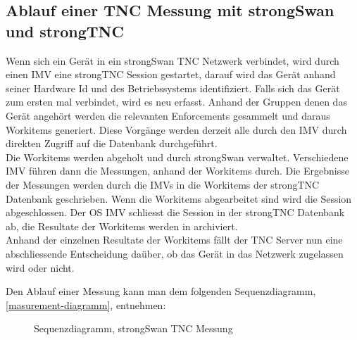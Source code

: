 \subsection{Ablauf einer TNC Messung mit strongSwan und strongTNC}
Wenn sich ein Gerät in ein strongSwan TNC Netzwerk verbindet, wird durch einen
IMV eine strongTNC Session gestartet, darauf wird das Gerät anhand seiner
Hardware Id und des Betriebssystems identifiziert. Falls sich das Gerät zum
ersten mal verbindet, wird es neu erfasst. Anhand der Gruppen denen das Gerät
angehört werden die relevanten Enforcements gesammelt und daraus Workitems
generiert. Diese Vorgänge werden derzeit alle durch den IMV durch direkten
Zugriff auf die Datenbank durchgeführt.\\
Die Workitems werden abgeholt und durch strongSwan verwaltet.
Verschiedene IMV führen dann die Messungen, anhand der Workitems durch. Die
Ergebnisse der Messungen werden durch die IMVs in die Workitems der strongTNC
Datenbank geschrieben. Wenn die Workitems abgearbeitet sind wird die Session
abgeschlossen. Der OS IMV schliesst die Session in der strongTNC Datenbank ab,
die Resultate der Workitems werden in archiviert.\\
Anhand der einzelnen Resultate der Workitems fällt der TNC Server nun eine
abschliessende Entscheidung daüber, ob das Gerät in das Netzwerk zugelassen wird
oder nicht.

Den Ablauf einer Messung kann man dem folgenden Sequenzdiagramm,
\autoref{masurement-diagramm}, entnehmen:
\begin{figure}[H]	
	\centering
	
	\caption{Sequenzdiagramm, strongSwan TNC Messung}
	\label{masurement-diagramm}
\end{figure}

